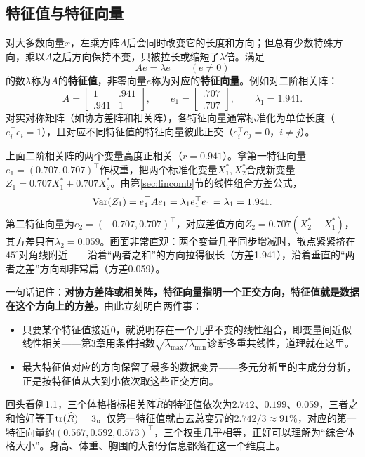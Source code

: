 \subsection{特征值与特征向量}
对大多数向量$x$，左乘方阵$A$后会同时改变它的长度和方向；但总有少数特殊方向，乘以$A$之后方向保持不变，只被拉长或缩短了$\lambda$倍。满足
\[
Ae=\lambda e\qquad (e\ne 0)
\]
的数$\lambda$称为$A$的\textbf{特征值}，非零向量$e$称为对应的\textbf{特征向量}。例如对二阶相关阵：
\[
A=\begin{bmatrix}1&.941\\.941&1\end{bmatrix},\qquad
e_1=\begin{bmatrix}.707\\.707\end{bmatrix},\qquad\lambda_1=1.941.
\]
对实对称矩阵（如协方差阵和相关阵），各特征向量通常标准化为单位长度（$e_i^\top e_i=1$），且对应不同特征值的特征向量彼此正交（$e_i^\top e_j=0$，$i\ne j$）。
\begin{sikao}
上面二阶相关阵的两个变量高度正相关（$r=0.941$）。拿第一特征向量$e_1=(0.707,0.707)^\top$作权重，把两个标准化变量$X_1^*,X_2^*$合成新变量$Z_1=0.707X_1^*+0.707X_2^*$。由第\ref{sec:lincomb}节的线性组合方差公式，
\[
\operatorname{Var}(Z_1)=e_1^\top A e_1=\lambda_1 e_1^\top e_1=\lambda_1=1.941 .
\]
第二特征向量为$e_2=(-0.707,0.707)^\top$，对应差值方向$Z_2=0.707(X_2^*-X_1^*)$，其方差只有$\lambda_2=0.059$。画面非常直观：两个变量几乎同步增减时，散点紧紧挤在$45^\circ$对角线附近——沿着“两者之和”的方向拉得很长（方差1.941），沿着垂直的“两者之差”方向却非常扁（方差0.059）。

一句话记住：\textbf{对协方差阵或相关阵，特征向量指明一个正交方向，特征值就是数据在这个方向上的方差。}由此立刻明白两件事：
\begin{itemize}
\item 只要某个特征值接近0，就说明存在一个几乎不变的线性组合，即变量间近似线性相关——第3章用条件指数$\sqrt{\lambda_{\max}/\lambda_{\min}}$诊断多重共线性，道理就在这里。
\item 最大特征值对应的方向保留了最多的数据变异——多元分析里的主成分分析，正是按特征值从大到小依次取这些正交方向。
\end{itemize}
回头看例1.1，三个体格指标相关阵$\widehat R$的特征值依次为$2.742$、$0.199$、$0.059$，三者之和恰好等于$\operatorname{tr}(\widehat R)=3$。仅第一特征值就占去总变异的$2.742/3\approx 91\%$，对应的第一特征向量约$(0.567,0.592,0.573)^\top$，三个权重几乎相等，正好可以理解为“综合体格大小”。身高、体重、胸围的大部分信息都落在这一个维度上。
\end{sikao}

